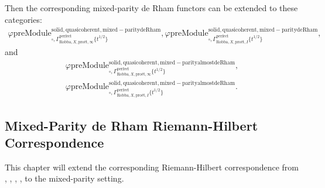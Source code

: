 \documentclass[12pt]{book}
\theoremstyle{definition}
\begin{document}
\indent Then the corresponding mixed-parity de Rham functors can be extended to these categories:
\begin{align}
\varphi\mathrm{preModule}^\mathrm{solid,quasicoherent,mixed-paritydeRham}_{\square,\Gamma^\mathrm{perfect}_{\text{Robba},X,\text{pro\'et},\infty}\{t^{1/2}\}},
\varphi\mathrm{preModule}^\mathrm{solid,quasicoherent,mixed-paritydeRham}_{\square,\Gamma^\mathrm{perfect}_{\text{Robba},X,\text{pro\'et},I}\{t^{1/2}\}}, 
\end{align}
and
\begin{align}
\varphi\mathrm{preModule}^\mathrm{solid,quasicoherent,mixed-parityalmostdeRham}_{\square,\Gamma^\mathrm{perfect}_{\text{Robba},X,\text{pro\'et},\infty}\{t^{1/2}\}},\\
\varphi\mathrm{preModule}^\mathrm{solid,quasicoherent,mixed-parityalmostdeRham}_{\square,\Gamma^\mathrm{perfect}_{\text{Robba},X,\text{pro\'et},I}\{t^{1/2}\}}. 
\end{align}


\subsection{Mixed-Parity de Rham Riemann-Hilbert Correspondence}


\indent This chapter will extend the corresponding Riemann-Hilbert correspondence from \cite{Sch1}, \cite{LZ}, \cite{BL1}, \cite{BL2}, \cite{M} to the mixed-parity setting.
\end{document}
